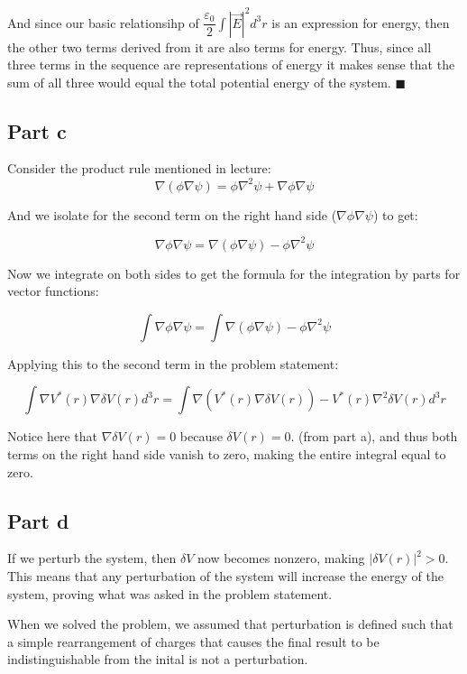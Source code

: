 \documentclass{article}
\theoremstyle{definition}
\numberwithin{equation}{section}
\numberwithin{definition}{section}
\begin{document}
    And since our basic relationsihp of $\dfrac{\varepsilon_0}{2}\int |\vec{E}|^2 d^3 r$ is an expression for energy, then the other two terms derived from it are also terms for energy. Thus, since all three terms in the sequence are representations of energy it makes sense that the sum of all three would equal the total potential energy of the system. $\blacksquare$ 

    \subsection{Part c}

    Consider the product rule mentioned in lecture:
    \[ \nabla (\phi \nabla \psi) = \phi \nabla^2 \psi  + \nabla \phi \nabla \psi\]

    And we isolate for the second term on the right hand side ($\nabla \phi \nabla \psi$) to get:
    
    \[ \nabla \phi \nabla \psi = \nabla(\phi \nabla \psi) - \phi \nabla^2 \psi\]

    Now we integrate on both sides to get the formula for the integration by parts for vector functions:

    \[ \int \nabla \phi \nabla \psi = \int \nabla (\phi \nabla \psi) - \phi \nabla^2 \psi\]

    Applying this to the second term in the problem statement:


    \[ \int \nabla V^*(r) \nabla \delta V(r) d^3r = \int \nabla(V^*(r) \nabla \delta V(r)) - V^*(r)\nabla^2 \delta V(r) d^3r\]

    Notice here that $\nabla \delta V(r) = 0$ because $\delta V(r) = 0$. (from part a), and thus both terms on the right hand side vanish to zero, making the entire integral equal to zero.

    \subsection{Part d}

    If we perturb the system, then $\delta V$ now becomes nonzero, making $|\delta V(r)|^2 > 0$. This means that any perturbation of the system will increase the energy of the system, proving what was asked in the problem statement. 

    When we solved the problem, we assumed that perturbation is defined such that a simple rearrangement of charges that causes the final result to be indistinguishable from the inital is not a perturbation.
\end{document}
